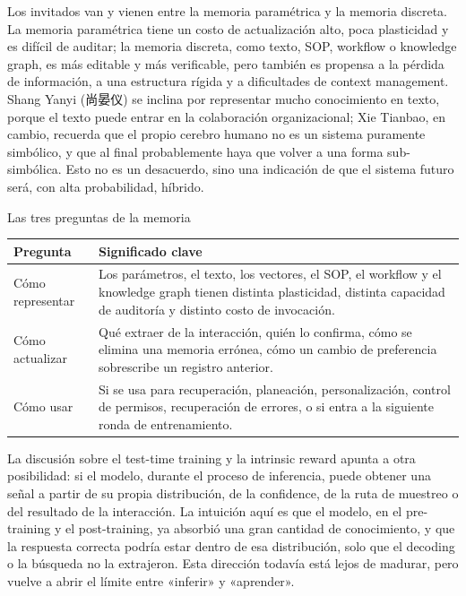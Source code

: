 \documentclass[a4paper]{article}
\begin{document}
Los invitados van y vienen entre la memoria paramétrica y la memoria discreta. La memoria paramétrica tiene un costo de actualización alto, poca plasticidad y es difícil de auditar; la memoria discreta, como texto, SOP, workflow o knowledge graph, es más editable y más verificable, pero también es propensa a la pérdida de información, a una estructura rígida y a dificultades de context management. Shang Yanyi (尚晏仪) se inclina por representar mucho conocimiento en texto, porque el texto puede entrar en la colaboración organizacional; Xie Tianbao, en cambio, recuerda que el propio cerebro humano no es un sistema puramente simbólico, y que al final probablemente haya que volver a una forma sub-simbólica. Esto no es un desacuerdo, sino una indicación de que el sistema futuro será, con alta probabilidad, híbrido.

\begin{knowledgebox}{Las tres preguntas de la memoria}
\begin{tabularx}{\textwidth}{>{\raggedright\arraybackslash}p{} Y}
\toprule
Pregunta & Significado clave \\
\midrule
Cómo representar & Los parámetros, el texto, los vectores, el SOP, el workflow y el knowledge graph tienen distinta plasticidad, distinta capacidad de auditoría y distinto costo de invocación. \\
Cómo actualizar & Qué extraer de la interacción, quién lo confirma, cómo se elimina una memoria errónea, cómo un cambio de preferencia sobrescribe un registro anterior. \\
Cómo usar & Si se usa para recuperación, planeación, personalización, control de permisos, recuperación de errores, o si entra a la siguiente ronda de entrenamiento. \\
\bottomrule
\end{tabularx}
\end{knowledgebox}

La discusión sobre el test-time training y la intrinsic reward apunta a otra posibilidad: si el modelo, durante el proceso de inferencia, puede obtener una señal a partir de su propia distribución, de la confidence, de la ruta de muestreo o del resultado de la interacción. La intuición aquí es que el modelo, en el pre-training y el post-training, ya absorbió una gran cantidad de conocimiento, y que la respuesta correcta podría estar dentro de esa distribución, solo que el decoding o la búsqueda no la extrajeron. Esta dirección todavía está lejos de madurar, pero vuelve a abrir el límite entre «inferir» y «aprender».
\end{document}

